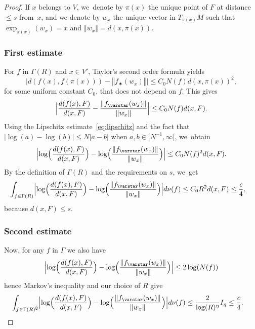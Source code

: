 \documentclass[JEP,XML,SOM,Unicode,published]{cedram}
\newcommand{\norm}[1]{{\left\Vert#1\right\Vert}}
\newcommand{\abs}[1]{\left\vert#1\right\vert}
\newcommand{\babs}[1]{\bigl\vert#1\bigr\vert}
\newcommand{\Babs}[1]{\Bigl\vert#1\Bigr\vert}
\newcommand{\Blrpar}[1]{\Bigl(#1\Bigr)}
\newcommand{\inv}{^{-1}}
\theoremstyle{plain}
\theoremstyle{definition}
\begin{document}
\begin{proof}
If $x$ belongs to $V$, we~denote by $\pi(x)$ the unique point of $F$ at distance $\leq s$ from~$x$, and we denote by $w_x$ the unique vector in $T_{\pi(x)}M$ such that $\exp_{\pi(x)}(w_x)=x$ and $\norm{w_x}=d(x,\pi(x))$.

\subsubsection*{First estimate}
For $f$ in $\Gamma(R)$ and $x\in V'$, Taylor's second order formula yields
\begin{equation}\label{eq:Taylor}
\babs{d(f(x),f(\pi(x))) - \norm{f_\varstar (w_x)}}\leq C_0 N(f)d(x, \pi(x))^2,
\end{equation}
for some uniform constant $C_0$, that does not depend on $f$. This gives
\begin{equation*}
\Babs{\frac{d(f(x),F)}{d(x, F)} - \frac{\norm{f_\varstar (w_x)}}{\norm{w_x}}} \leq C_0 N(f) d(x,F).
\end{equation*}
Using the Lipschitz estimate~\eqref{eq:lipschitz} and the fact that $\abs{\log(a) -\log(b)}\leq N\abs{a-b}$ when $a, b\in [N\inv,\infty[$, we~obtain
\begin{equation}\label{eq:delta_1}
\Babs{\log\Blrpar{\frac{d(f(x),F)}{d(x, F)}} - \log\Blrpar{\frac{\norm{f_\varstar (w_x)}}{\norm{w_x}}}} \leq C_0 N(f)^2 d(x,F).
\end{equation}
By the definition of $\Gamma(R)$ and the requirements on $s$, we~get
\begin{align*}
\int_{f\in \Gamma(R)} \Babs{\log\Blrpar{\frac{d(f(x),F)}{d(x, F)}}- \log\Blrpar{\frac{\norm{f_\varstar (w_x)}}{\norm{w_x}}}} d\nu(f) & \leq C_0 R^2 d(x,F) \leq \frac{c}{4},
\end{align*}
because $d(x,F)\leq s$.

\subsubsection*{Second estimate}
Now, for any $f$ in $\Gamma$ we also have
\begin{equation}\label{eq:lipschitz_log_ratio_estimate}
\Babs{\log\Blrpar{\frac{d(f(x),F)}{d(x, F)}} - \log\Blrpar{\frac{\norm{f_\varstar (w_x)}}{\norm{w_x}}}} \leq 2\log(N(f))
\end{equation}
hence Markov's inequality and our choice of $R$ give
\begin{align*}
\int_{f\in \Gamma(R)^\complement} \Babs{\log\Blrpar{\frac{d(f(x),F)}{d(x, F)}} - \log\Blrpar{\frac{\norm{f_\varstar (w_x)}}{\norm{w_x}}}} d\nu(f)& \leq \frac{2}{\log(R)^\eta}I_\eta \leq \frac{c}{4}.
\end{align*}


\end{proof}
\end{document}
